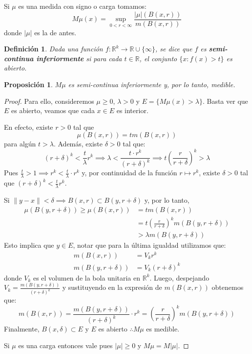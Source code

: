 \documentclass[12pt,a4paper]{article}
\theoremstyle{profesional}
\newtheorem{proposicion}{Proposición}[section]
\theoremstyle{definicion-style}
\newtheorem{definicion}{Definición}[section]
\newcommand{\R}{\mathbb{R}}
\begin{document}
Si \( \mu \) es una medida con signo o carga tomamos: \[
    M \mu(x) = \sup_{0 < r < \infty} \frac{|\mu|(B(x, r))}{m(B(x, r))}
\]
donde \( |\mu| \) es la de antes.

\begin{definicion}
    Dada una función \( f: \R^k \to \R \cup \{ \infty \} \), se dice que \( f \) es \textbf{semi-continua inferiormente} si para cada \( t \in \R \), el conjunto \( \{ x : f(x) > t \} \) es abierto.
\end{definicion}

\begin{proposicion}
    \( M \mu \) es semi-continua inferiormente y, por lo tanto, medible.
\end{proposicion}
\begin{proof}
    Para ello, consideremos \( \mu \geq 0 \), \( \lambda > 0 \) y \( E = \{ M \mu(x) > \lambda \} \). Basta ver que \( E \) es abierto, veamos que cada \( x \in E \) es interior.

    En efecto, existe \( r > 0 \) tal que \[
        \mu(B(x,r)) = t m(B(x,r))
    \]
    para algún \( t > \lambda \). Además, existe \( \delta > 0 \) tal que:\[
        {(r+\delta)}^k < \frac{t}{\lambda} r^k \implies \lambda < \frac{t \cdot r^k}{{(r+\delta)}^k} \implies t {\left(\frac{r}{r+\delta}\right)}^k > \lambda
    \]
    Pues \( \frac{t}{\lambda} > 1 \implies r^k < \frac{t}{\lambda} \cdot r^k \) y, por continuidad de la función \( r \mapsto r^k \), existe \( \delta > 0 \) tal que \( {(r+\delta)}^k < \frac{t}{\lambda} r^k \).

    Si \( \| y - x \| < \delta \implies B(x,r) \subset B(y, r+\delta) \) y, por lo tanto, \begin{align*}
        \mu(B(y, r+\delta)) \geq \mu(B(x, r)) & = t m(B(x,r))                                               \\
                                              & = t {\left( \frac{r}{r+\delta} \right)}^k m(B(y, r+\delta)) \\
                                              & > \lambda m(B(y, r+\delta))
    \end{align*}
    Esto implica que \( y \in E \), notar que para la última igualdad utilizamos que:\begin{align*}
        m(B(x, r))        & = V_k r^k            \\
        m(B(y, r+\delta)) & = V_k {(r+\delta)}^k
    \end{align*}
    donde \( V_k \) es el volumen de la bola unitaria en \( \R^k \).
    Luego, despejando \( V_k = \frac{m(B(y, r+\delta))}{{(r+\delta)}^k} \) y sustituyendo en la expresión de \( m(B(x, r)) \) obtenemos que:\[
        m(B(x, r)) = \frac{m(B(y, r+\delta))}{{(r+\delta)}^k} \cdot r^k = {\left( \frac{r}{r+\delta} \right)}^k m(B(y, r+\delta))
    \]
    Finalmente, \( B(x, \delta) \subset E \) y \( E \) es abierto \( \therefore M \mu \) es medible.

    Si \( \mu \) es una carga entonces vale pues \( |\mu| \geq 0 \) y \( M \mu = M |\mu| \).
\end{proof}
\end{document}
